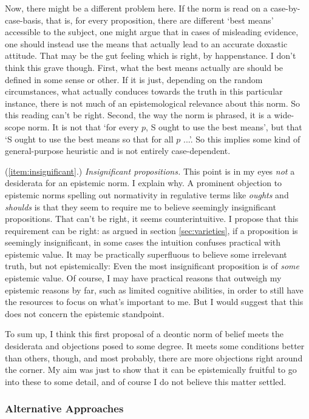 \documentclass[12pt,numbers=noenddot]{scrartcl}
\begin{document}
Now, there might be a different problem here. If the norm is read on a case-by-case-basis, that is, for every proposition, there are different ‘best means’ accessible to the subject, one might argue that in cases of misleading evidence, one should instead use the means that actually lead to an accurate doxastic attitude. That may be the gut feeling which is right, by happenstance. I don't think this grave though. First, what the best means actually are should be defined in some sense or other. If it is just, depending on the random circumstances, what actually conduces towards the truth in this particular instance, there is not much of an epistemological relevance about this norm. So this reading can't be right. Second, the way the norm is phrased, it is a wide-scope norm. It is not that ‘for every $p$, S ought to use the best means’, but that ‘S ought to use the best means so that for all $p$ ...’. So this implies some kind of general-purpose heuristic and is not entirely case-dependent.

(\ref{item:insignificant}.) \emph{Insignificant propositions.}
This point is in my eyes \emph{not} a desiderata for an epistemic norm. I explain why. A prominent objection to epistemic norms spelling out normativity in regulative terms like \emph{oughts} and \emph{shoulds} is that they seem to require me to believe seemingly insignificant propositions. That can't be right, it seems counterintuitive. I propose that this requirement can be right: as argued in section \ref{sec:varieties}, if a proposition is seemingly insignificant, in some cases the intuition confuses practical with epistemic value. It may be practically superfluous to believe some irrelevant truth, but not epistemically: Even the most insignificant proposition is of \emph{some} epistemic value. Of course, I may have practical reasons that outweigh my epistemic reasons by far, such as limited cognitive abilities, in order to still have the resources to focus on what's important to me. But I would suggest that this does not concern the epistemic standpoint.

To sum up, I think this first proposal of a deontic norm of belief meets the desiderata and objections posed to some degree. It meets some conditions better than others, though, and most probably, there are more objections right around the corner. My aim was just to show that it can be epistemically fruitful to go into these to some detail, and of course I do not believe this matter settled.

\subsubsection{Alternative Approaches}
\end{document}
